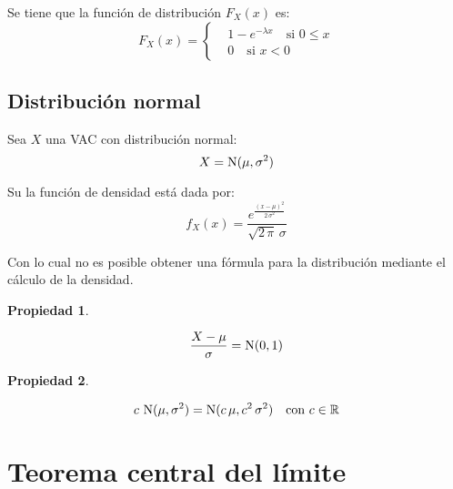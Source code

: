 \documentclass[a5paper,12pt,twoside]{book}
\newtheorem{prop}{{Propiedad}}[chapter]
\begin{document}
Se tiene que la función de distribución $F_X(x)$ es:
\begin{equation*}
    F_X(x) =
    \left\{
    \begin{aligned}
        & 1-e^{-\lambda x} \quad \text{si } 0 \leq x
        \\
        & 0 \quad \text{si } x < 0
    \end{aligned}
    \right.
\end{equation*}


\subsection{Distribución normal}

Sea $X$ una VAC con distribución normal:
\begin{equation}
    X = \operatorname{N}(\mu,\sigma^2)
\end{equation}

Su la función de densidad está dada por:
\begin{equation*}
    f_X(x) = \frac{e^{\tfrac{(x-\mu)^2}{2 \, \sigma^2}}}{\sqrt{2 \, \pi} \, \sigma}
\end{equation*}

Con lo cual no es posible obtener una fórmula para la distribución mediante el cálculo de la densidad.

\begin{mdframed}[style=MyFrame1]
    \begin{prop}
    \end{prop}
    \begin{equation*}
        \frac{X-\mu}{\sigma} = \operatorname{N}(0,1)
    \end{equation*}
\end{mdframed}

\begin{mdframed}[style=MyFrame1]
    \begin{prop}
    \end{prop}
    \begin{equation*}
        c \, \operatorname{N}(\mu,\sigma^2) = \operatorname{N}(c \, \mu, c^2 \, \sigma^2) \quad \text{con } c \in \mathbb{R}
    \end{equation*}
\end{mdframed}


\section{Teorema central del límite}
\end{document}

